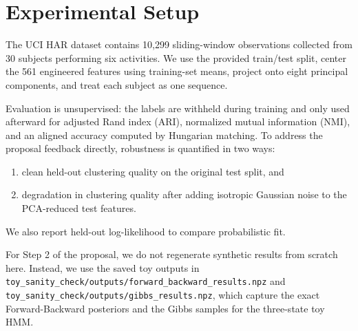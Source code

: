 \section{Experimental Setup}
The UCI HAR dataset contains 10,299 sliding-window observations collected from 30 subjects performing six activities. We use the provided train/test split, center the 561 engineered features using training-set means, project onto eight principal components, and treat each subject as one sequence.

Evaluation is unsupervised: the labels are withheld during training and only used afterward for adjusted Rand index (ARI), normalized mutual information (NMI), and an aligned accuracy computed by Hungarian matching. To address the proposal feedback directly, robustness is quantified in two ways:
\begin{enumerate}
\item clean held-out clustering quality on the original test split, and
\item degradation in clustering quality after adding isotropic Gaussian noise to the PCA-reduced test features.
\end{enumerate}
We also report held-out log-likelihood to compare probabilistic fit.

For Step 2 of the proposal, we do not regenerate synthetic results from scratch here. Instead, we use the saved toy outputs in \texttt{toy\_sanity\_check/outputs/forward\_backward\_results.npz} and \texttt{toy\_sanity\_check/outputs/gibbs\_results.npz}, which capture the exact Forward-Backward posteriors and the Gibbs samples for the three-state toy HMM.
